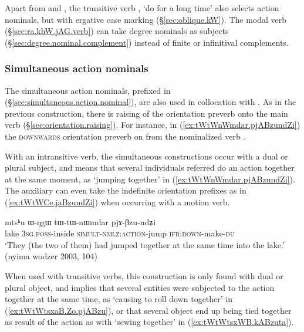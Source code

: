 Apart from  and , the transitive verb , `do for a long time' also selects action nominals, but with ergative case marking (§\ref{sec:oblique.kW}). The modal verb  (§\ref{sec:ra.khW.jAG.verb}) can take degree nominals as subjects (§\ref{sec:degree.nominal.complement}) instead of finite or infinitival complements.


\subsubsection{Simultaneous action nominals} \label{sec:simult.action.nominal.Bzu}
The simultaneous action nominals, prefixed in  (§\ref{sec:simultaneous.action.nominal}), are also used in collocation with .   As in the previous construction, there is raising of the orientation preverb onto the main verb  (§\ref{sec:orientation.raising}). For instance,  in (\ref{ex:tWtWnWmdar.pjABzundZi}) the \textsc{downwards} orientation preverb  on  from the nominalized verb . 

With an intransitive verb, the simultaneous constructions occur with a dual or plural subject, and means that several individuals referred do an action together at the same moment, as  `jumping together' in (\ref{ex:tWtWnWmdar.pjABzundZi}). The auxiliary  can even take the indefinite orientation prefixes   as in (\ref{ex:tWtWCe.jaBzundZi}) when occurring with a motion verb.

\begin{exe}
	\ex \label{ex:tWtWnWmdar.pjABzundZi}
	\gll  mtsʰu ɯ-ŋgɯ tɯ-tɯ-nɯmdar pjɤ-βzu-ndʑi  \\
	lake \textsc{3sg}.\textsc{poss}-inside \textsc{simult}-\textsc{nmlz}:\textsc{action}-jump \textsc{ifr}:\textsc{down}-make-\textsc{du}  \\
	\glt `They (the two of them) had jumped together at the same time into the lake.' (nyima wodzer 2003, 104)
\end{exe}

When used with transitive verbs, this construction is only found with dual or plural object, and implies that several entities were subjected to the action together at the same time, as  `causing to roll down together' in (\ref{ex:tWtWtsxaB.Zo.pjABzu}), or that several object end up being tied together as result of the action as with  `sewing together' in (\ref{ex:tWtWtsxWB.kABzuta}). 



